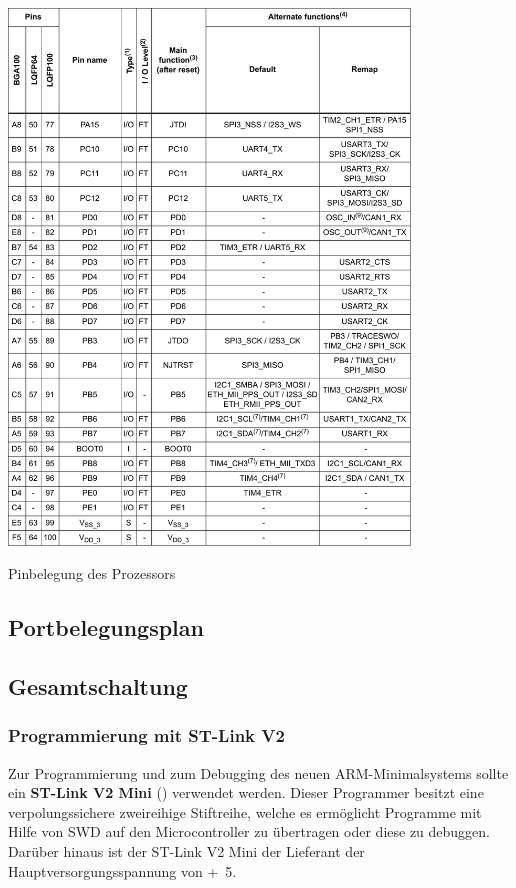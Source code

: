 \begin{table}[htb]\ContinuedFloat
    \centering
    \includegraphics[width=0.8\textwidth]{Schuh/Pictures/Pinbelegung5}
    \caption[Pinbelegung des Prozessors]{Pinbelegung des Prozessors}
\end{table}

\subsection{Portbelegungsplan}
\label{sec:coremodul-portbelegung}

\subsection{Gesamtschaltung}
\label{sec:coremodul-schaltung}

\subsubsection{Programmierung mit ST-Link V2}
\label{sec:coremodul-stlink}
Zur Programmierung und zum \gls{Debugging} des neuen \gls{ARM}-\gls{Minimalsystem}s sollte ein \textbf{ST-Link V2 Mini} () verwendet werden. Dieser Programmer besitzt eine verpolungssichere zweireihige Stiftreihe, welche es ermöglicht Programme mit Hilfe von \gls{SWD} auf den Microcontroller zu übertragen oder diese zu debuggen. Darüber hinaus ist der ST-Link V2 Mini der Lieferant der Hauptversorgungsspannung von \unit{+5}{\volt}.

